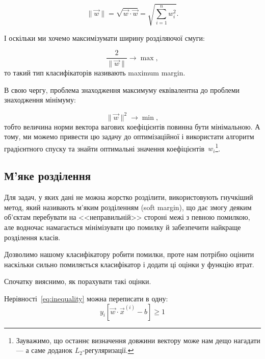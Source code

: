 \documentclass[]{article}
\begin{document}
\begin{equation*}
	\|\vec{w}\| = \sqrt{\vec{w}\cdot \vec{w} } = \sqrt{\sum_{i=1}^n w_i^2}.
\end{equation*}

І оскільки ми хочемо максимізумати ширину розділяючої смуги:

\begin{equation*}
    \dfrac2{\|\vec{w}\|} \to \max,
\end{equation*}
то такий тип класифікаторів називають maximum margin.

В свою чергу, проблема знаходження максимуму еквівалентна до проблеми знаходження мінімуму:

\begin{equation*}
   \|\vec{w}\|^2 \to \min,
\end{equation*}
тобто величина норми вектора вагових коефіцієнтів повинна бути мінімальною. А тому, ми можемо привести цю задачу до оптимізаційної і використати алгоритм градієнтного спуску та знайти оптимальні значення коефіцієнтів~$w_i$\footnote{Зауважимо, що останнє визначення довжини вектору може нам дещо нагадати --- а саме доданок $L_2$-регуляризації.}.



\subsection{М'яке розділення}

Для задач, у яких дані не можна жорстко розділити, використовують гнучкіший метод, який називають м'яким розділенням (soft margin), що дає змогу деяким об'єктам перебувати на <<неправильній>> стороні межі з певною помилкою, але водночас намагається мінімізувати цю помилку й забезпечити найкраще розділення класів.



Дозволимо нашому класифікатору робити помилки, проте нам потрібно оцінити наскільки сильно помиляється класифікатор і додати ці оцінки у функцію втрат.

Спочатку вияснимо, як порахувати такі оцінки.

Нерівності~\eqref{eq:inequality} можна переписати в одну:
\begin{equation}\label{eq:integrateg_ineq}
    y_i \left[ \vec{w}\cdot \vec{x}^{(i)} - b \right] \geqslant 1
\end{equation}
\end{document}
